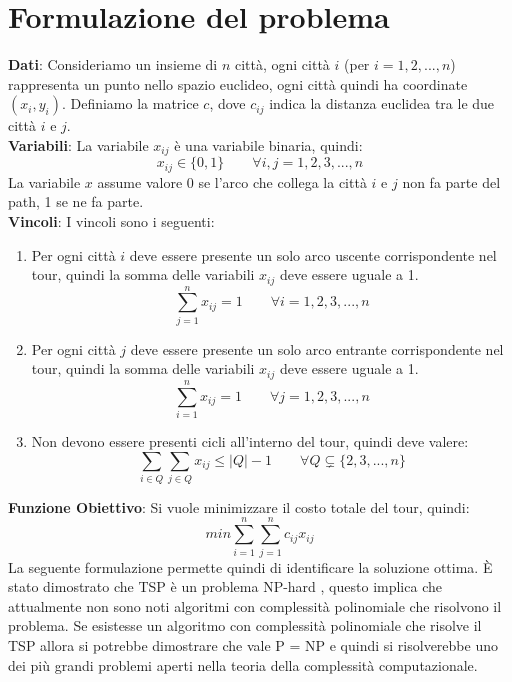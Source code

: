 \documentclass[a4paper,12pt]{report}
\begin{document}
\section{Formulazione del problema}
\textbf{Dati}: Consideriamo un insieme di $n$ città, ogni città $i$ (per $i = 1, 2, ..., n$) rappresenta un punto nello spazio euclideo, ogni città quindi ha coordinate $(x_i, y_i)$. Definiamo la matrice $c$, dove $c_{ij}$ indica la distanza euclidea tra le due città $i$ e $j$.
\\[1\baselineskip]
\textbf{Variabili}: La variabile $x_{ij}$ è una variabile binaria, quindi: $$ x_{ij} \in \{0, 1\} \qquad \forall i, j = 1, 2, 3, ..., n $$ La variabile $x$ assume valore 0 se l'arco che collega la città $i$ e $j$ non fa parte del path, 1 se ne fa parte.
\\[1\baselineskip] \textbf{Vincoli}: I vincoli sono i seguenti:
\begin{enumerate}
        \item Per ogni città $i$ deve essere presente un solo arco uscente corrispondente nel tour, quindi la somma delle variabili $x_{ij}$ deve essere uguale a 1. $$\sum_{j = 1}^{n} x_{ij} = 1 \qquad \forall i = 1, 2, 3, ..., n$$
        \item Per ogni città $j$ deve essere presente un solo arco entrante corrispondente nel tour, quindi la somma delle variabili $x_{ij}$ deve essere uguale a 1. $$\sum_{i = 1}^{n} x_{ij} = 1 \qquad \forall j = 1, 2, 3, ..., n$$
        \item Non devono essere presenti cicli all'interno del tour, quindi deve valere: $$ \sum_{i \in Q}{\sum_{j \in Q}{x_{ij} \le |Q| - 1}} \qquad \forall Q \subsetneq \{2, 3, ..., n\} $$
\end{enumerate}
\textbf{Funzione Obiettivo}: Si vuole minimizzare il costo totale del tour, quindi:
$$min \sum_{i = 1}^{n} \sum_{j = 1}^{n} c_{ij} x_{ij}$$
La seguente formulazione permette quindi di identificare la soluzione ottima.
\newline \null \newline È stato dimostrato che TSP è un problema NP-hard \cite{TSP NP Completezza}, questo implica che attualmente non sono noti algoritmi con complessità polinomiale che risolvono il problema. Se esistesse un algoritmo con complessità polinomiale che risolve il TSP allora si potrebbe dimostrare che vale P = NP e quindi si risolverebbe uno dei più grandi problemi aperti nella teoria della complessità computazionale. 
\end{document}
